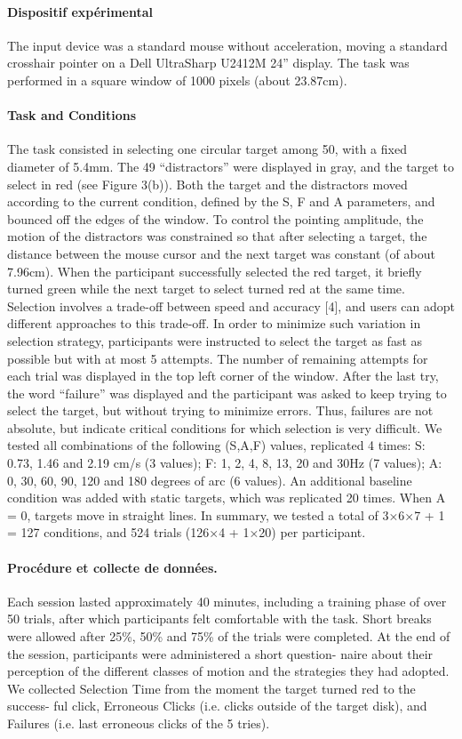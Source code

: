 \paragraph{Dispositif expérimental}
The input device was a standard mouse without acceleration, moving a
standard crosshair pointer on a Dell UltraSharp U2412M 24” display. The task was
performed in a square window of 1000 pixels (about 23.87cm).

\paragraph{Task and Conditions}
The task consisted in selecting one circular target among 50,
with a fixed diameter of 5.4mm. The 49 “distractors” were displayed in gray, and the
target to select in red (see Figure 3(b)). Both the target and the distractors moved
according to the current condition, defined by the S, F and A parameters, and bounced
off the edges of the window. To control the pointing amplitude, the motion of the
distractors was constrained so that after selecting a target, the distance between the
mouse cursor and the next target was constant (of about 7.96cm). When the participant successfully selected the red target, it briefly turned green while the next target to
select turned red at the same time.
Selection involves a trade-off between speed and accuracy [4], and users can adopt
different approaches to this trade-off. In order to minimize such variation in selection
strategy, participants were instructed to select the target as fast as possible but with at
most 5 attempts. The number of remaining attempts for each trial was displayed in the
top left corner of the window. After the last try, the word “failure” was displayed and
the participant was asked to keep trying to select the target, but without trying to
minimize errors. Thus, failures are not absolute, but indicate critical conditions for
which selection is very difficult.
We tested all combinations of the following (S,A,F) values, replicated 4 times:
 S: 0.73, 1.46 and 2.19 cm/s (3 values);
 F: 1, 2, 4, 8, 13, 20 and 30Hz (7 values);
 A: 0, 30, 60, 90, 120 and 180 degrees of arc (6 values).
An additional baseline condition was added with static targets, which was replicated 20 times. When A = 0, targets move in straight lines. In summary, we tested a total of 3×6×7 + 1 = 127 conditions, and 524 trials (126×4 + 1×20) per participant.

\paragraph{Procédure et collecte de données.}
Each session lasted approximately 40 minutes, including a training phase of over 50 trials, after which participants felt comfortable
with the task. Short breaks were allowed after 25\%{}, 50\%{} and 75\%{} of the trials were
completed. At the end of the session, participants were administered a short question-
naire about their perception of the different classes of motion and the strategies they
had adopted.
We collected Selection Time from the moment the target turned red to the success-
ful click, Erroneous Clicks (i.e. clicks outside of the target disk), and Failures (i.e.
last erroneous clicks of the 5 tries).

